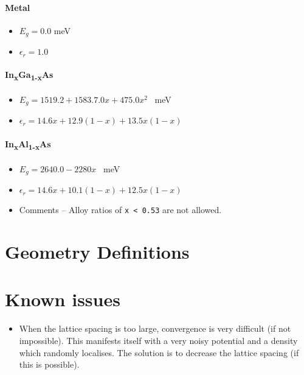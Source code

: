 \documentclass[12pt]{article}
\newcommand{\dealii}{\texttt{deal.II}}
\newcommand{\commentout}[1]{}
\begin{document}
\paragraph{Metal}
\begin{itemize}
    \item{$E_g = 0.0$ meV}
    \item{$\epsilon_r = 1.0$}
\end{itemize}

\paragraph{In\textsubscript{x}Ga\textsubscript{1-x}As}
\begin{itemize}
    \item{$E_g = 1519.2 + 1583.7.0 x + 475.0 x^2$ \ meV}
    \item{$\epsilon_r = 14.6 x + 12.9 (1-x) + 13.5 x (1-x)$}
\end{itemize}

\paragraph{In\textsubscript{x}Al\textsubscript{1-x}As}
\begin{itemize}
    \item{$E_g = 2640.0 - 2280x$ \ meV}
    \item{$\epsilon_r = 14.6 x + 10.1 (1-x) + 12.5 x (1-x)$}
    \item Comments -- Alloy ratios of \texttt{x < 0.53} are not allowed.
\end{itemize}

\section{Geometry Definitions}
\label{app:GeometryDefinitions}

\section{Known issues}
\begin{itemize}
\commentout{
    \item The \dealii{} solver for the Newton iteration step can stop without warning
    when solving the finite element matrix equation.  This error manifests itself when
    \dealii{} does not create a \texttt{x.dat}.   The exception (which comes from
    \dealii{}) says \texttt{Unknown exception!\textbackslash nAborting!}, followed by a stack
    trace.  Sometimes this can be solved by decreasing the accuracy of the matrix
    solver in \dealii{}.  This is done by changing the second argument of the \texttt{SolverControl}
    class in the \texttt{NewtonProblem<dim>::solve~()} method.  Another possible solution is
    to change the lattice spacing on which the density is calculated.
}
    \item When the lattice spacing is too large, convergence is very difficult (if not impossible).
    This manifests itself with a very noisy potential and a density which randomly localises.
    The solution is to decrease the lattice spacing (if this is possible).
\end{itemize}
\end{document}
